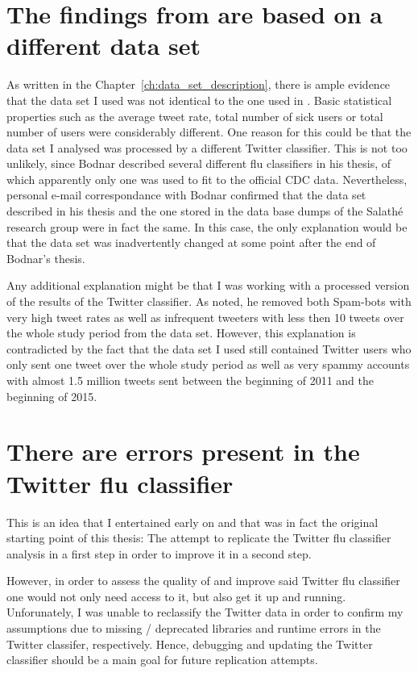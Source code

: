 \documentclass[11pt, a4paper,twoside]{report}\usepackage[]{graphicx}\usepackage[]{color}
\begin{document}
\section{The findings from \cite{bodnar_data_2015} are based on a different data set}
\label{sec:diff_data_set}
As written in the Chapter~\ref{ch:data_set_description}, there is ample evidence that the data set I used was not identical to the one used in \cite{bodnar_data_2015}. Basic statistical properties such as the average tweet rate, total number of sick users or total number of users were considerably different. One reason for this could be that the data set I analysed was processed by a different Twitter classifier. This is not too unlikely, since Bodnar described several different flu classifiers in his thesis, of which apparently only one was used to fit to the official CDC data. Nevertheless, personal e-mail correspondance with Bodnar confirmed that the data set described in his thesis and the one stored in the data base dumps of the Salathé research group were in fact the same. In this case, the only explanation would be that the data set was inadvertently changed at some point after the end of Bodnar's thesis.

Any additional explanation might be that I was working with a processed version of the results of the Twitter classifier. As \cite{bodnar_data_2015} noted, he removed both Spam-bots with very high tweet rates as well as infrequent tweeters with less then 10 tweets over the whole study period from the data set. However, this explanation is contradicted by the fact that the data set I used still contained Twitter users who only sent one tweet over the whole study period as well as very spammy accounts with almost 1.5 million tweets sent between the beginning of 2011 and the beginning of 2015.

\section{There are errors present in the Twitter flu classifier}
This is an idea that I entertained early on and that was in fact the original starting point of this thesis: The attempt to replicate the Twitter flu classifier analysis in a first step in order to improve it in a second step.

However, in order to assess the quality of and improve said Twitter flu classifier one would not only need access to it, but also get it up and running. Unforunately, I was unable to reclassify the Twitter data in order to confirm my assumptions due to missing / deprecated libraries and runtime errors in the Twitter classifer, respectively. Hence, debugging and updating the Twitter classifier should be a main goal for future replication attempts.
\end{document}
